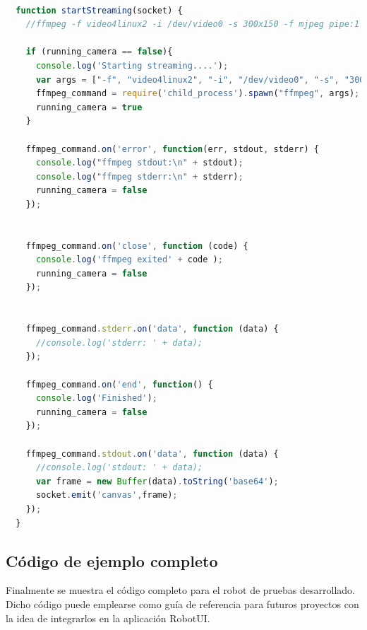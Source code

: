 \begin{lstlisting}[language=JavaScript]

  function startStreaming(socket) {
    //ffmpeg -f video4linux2 -i /dev/video0 -s 300x150 -f mjpeg pipe:1 -b:v 28k -bufsize 28k

    if (running_camera == false){
      console.log('Starting streaming....');
      var args = ["-f", "video4linux2", "-i", "/dev/video0", "-s", "300x150","-f","mjpeg", "pipe:1", "-b:v 28k", "-bufsize 28k"]
      ffmpeg_command = require('child_process').spawn("ffmpeg", args);
      running_camera = true
    }

    ffmpeg_command.on('error', function(err, stdout, stderr) {
      console.log("ffmpeg stdout:\n" + stdout);
      console.log("ffmpeg stderr:\n" + stderr);
      running_camera = false
    });


    ffmpeg_command.on('close', function (code) {
      console.log('ffmpeg exited' + code );
      running_camera = false
    });


    ffmpeg_command.stderr.on('data', function (data) {
      //console.log('stderr: ' + data);
    });

    ffmpeg_command.on('end', function() {
      console.log('Finished');
      running_camera = false
    });

    ffmpeg_command.stdout.on('data', function (data) {
      //console.log('stdout: ' + data);
      var frame = new Buffer(data).toString('base64');
      socket.emit('canvas',frame);
    });
  }

\end{lstlisting}



\subsection{Código de ejemplo completo}

Finalmente se muestra el código completo para el robot de pruebas desarrollado. Dicho código puede emplearse como guía de referencia para futuros proyectos con la idea de integrarlos en la aplicación RobotUI.\\


